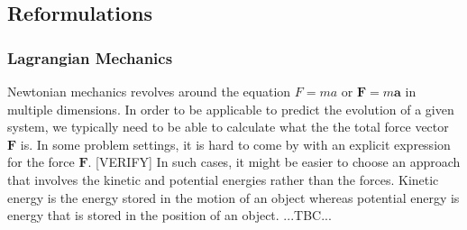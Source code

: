 







\subsection{Reformulations}

\subsubsection{Lagrangian Mechanics}

Newtonian mechanics revolves around the equation $F = m a$ or $\mathbf{F} = m \mathbf{a}$ in multiple dimensions. In order to be applicable to predict the evolution of a given system, we typically need to be able to calculate what the the total force vector $\mathbf{F}$ is. In some problem settings, it is hard to come by with an explicit expression for the force $\mathbf{F}$. [VERIFY] In such cases, it might be easier to choose an approach that involves the kinetic and potential energies rather than the forces. Kinetic energy is the energy stored in the motion of an object whereas potential energy is energy that is stored in the position of an object. ...TBC...







